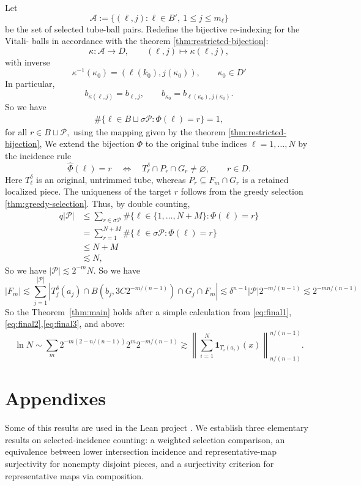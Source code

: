\documentclass[11pt, letterpaper]{nyjm}
\begin{document}
	Let
	\[
	\mathcal A
	:=
	\{(\ell,j):\ell\in B',\ 1\le j\le m_\ell\}
	\]
	be the set of selected tube-ball pairs.
	Redefine the bijective re-indexing for the Vitali- balls in accordance with the theorem \ref{thm:restricted-bijection}:
	\[
	\kappa:\mathcal A\longrightarrow D,
	\qquad
	(\ell,j)\longmapsto \kappa(\ell,j),
	\]
	with inverse
	\[
	\kappa^{-1}(\kappa_0)
	=
	(\ell(k_0),j(\kappa_0)),
	\qquad \kappa_0 \in D'
	\]
	In particular,
	\[
	b_{\kappa(\ell,j)}=b_{\ell,j},
	\qquad
	b_{\kappa_0}=b_{\ell(\kappa_0),j(\kappa_0)}.
	\] 
	So we have
	\[
	\begin{aligned}
	\#\{\ell \in B \sqcup \sigma \mathcal P: \Phi(\ell) = r\} 
	= 1, 
	\end{aligned}
	\]
	for all $r \in  B \sqcup \mathcal P,$
	using the mapping given by the theorem \ref{thm:restricted-bijection},
	We extend the bijection $\Phi$ to the original tube
	indices $\ell=1,\ldots,N$ by the incidence rule
	\[
	\widehat{\Phi}(\ell)=r
	\quad\Longleftrightarrow\quad
	T_\ell^\delta\cap P_r\cap G_r\ne\varnothing,
	\qquad r\in D.
	\]
	Here $T_\ell^\delta$ is an original, untrimmed tube,
	whereas $P_r\subseteq F_m\cap G_r$ is a retained
	localized piece.
	The uniqueness of the target $r$ follows from the greedy selection \ref{thm:greedy-selection}.  
	Thus, by double counting,
	\[
	\begin{aligned}
		q|\mathcal P|
		&\leq 
	    \sum_{r \in \sigma \mathcal P}
		\#\{\ell \in \{1,\ldots,N+M\}: \Phi(\ell) = r\}  \\
		&= 
		\sum_{r = 1}^{N+M}
		\#\{\ell \in \sigma \mathcal P: \Phi(\ell) = r\}  \\
		&\leq N + M \\
		&\lesssim N
		,
	\end{aligned}
	\]
	So we have $|\mathcal P| \lesssim 2^{-m}N.$
	So we have 
	\begin{equation}
		|F_m| \lesssim \sum_ {j=1}^{|\mathcal P|}|T^\delta_j(a_j) \cap B(b_{j},3C2^{-m/(n-1)}) \cap G_j \cap F_m| \lesssim \delta^{n-1}|\mathcal P|2^{-m/(n-1)} \lesssim 2^{-mn/(n-1)} 
	\end{equation}
	So the Theorem~\ref{thm:main} holds after a simple calculation from \eqref{eq:final1}, \eqref{eq:final2},\eqref{eq:final3}, and above:
	\[
	\ln N \sim \sum_m 2^{-m(2-n/(n-1))} 2^{m}2^{-m/(n-1)}
	\gtrsim \left\| \sum_{i=1}^{N} \mathbf{1}_{T_i(a_i)}(x)
	\right\|_{n/(n-1)}^{n/(n-1)}.
	\] 
	
	\section{Appendixes}
	\appendix
	Some of this results are used in the Lean project \cite{Aspegren2026Lean}.
	We establish three elementary results on selected-incidence counting: a weighted selection comparison, an equivalence between lower intersection incidence and representative-map surjectivity for nonempty disjoint pieces, and a surjectivity criterion for representative maps via composition. 
	
\end{document}
